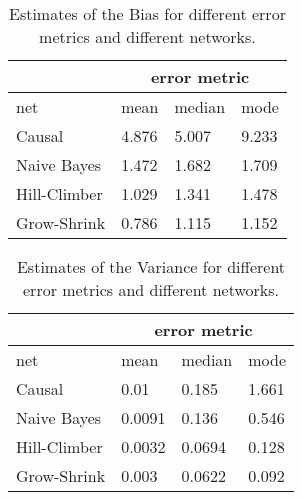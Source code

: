 \begin{table}[h]
\caption[Bias]{Estimates of the Bias for different error metrics and different networks.}
\centering
\begin{tabular}{ l l l l }
 \hline
 & \multicolumn{3}{c}{error metric} \\
 \hline
 net & mean & median & mode\\
 \hline
 Causal & 4.876 & 5.007 & 9.233\\
 Naive Bayes& 1.472 & 1.682 & 1.709\\
 Hill-Climber & 1.029 & 1.341 & 1.478\\
 Grow-Shrink & 0.786 & 1.115 & 1.152\\
\end{tabular}
\label{tab:bias}
\end{table}

\begin{table}[h]
\caption[Variance]{Estimates of the Variance for different error metrics and different networks.}
\centering
\begin{tabular}{ l l l l }
 \hline
  & \multicolumn{3}{c}{error metric} \\
 \hline
 net & mean & median & mode\\
 \hline
 Causal & 0.01& 0.185 & 1.661\\
 Naive Bayes& 0.0091 & 0.136 & 0.546\\
 Hill-Climber & 0.0032 & 0.0694 & 0.128\\
 Grow-Shrink & 0.003 & 0.0622& 0.092\\
\end{tabular}
\label{tab:variance}
\end{table}